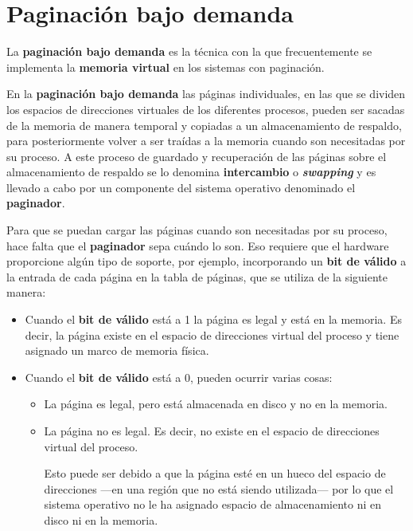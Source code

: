\section{Paginación bajo demanda}\label{_paginaciuxf3n_bajo_demanda}

La \textbf{paginación bajo demanda}{} es la técnica con la que
frecuentemente se implementa la \textbf{memoria virtual} en los sistemas
con paginación.

En la \textbf{paginación bajo demanda} las páginas individuales, en las
que se dividen los espacios de direcciones virtuales de los diferentes
procesos, pueden ser sacadas de la memoria de manera temporal y copiadas
a un almacenamiento de respaldo, para posteriormente volver a ser
traídas a la memoria cuando son necesitadas por su proceso. A este
proceso de guardado y recuperación de las páginas sobre el
almacenamiento de respaldo se lo denomina \textbf{{}intercambio} o
\textbf{\emph{{}swapping}} y es llevado a cabo por un componente del
sistema operativo denominado el \textbf{{}paginador}.

Para que se puedan cargar las páginas cuando son necesitadas por su
proceso, hace falta que el \textbf{paginador} sepa cuándo lo son. Eso
requiere que el hardware proporcione algún tipo de soporte, por ejemplo,
incorporando un \textbf{bit de válido}{} a la entrada de cada página en
la tabla de páginas, que se utiliza de la siguiente manera:

\begin{itemize}
\item
  Cuando el \textbf{bit de válido} está a 1 la página es legal y está en
  la memoria. Es decir, la página existe en el espacio de direcciones
  virtual del proceso y tiene asignado un marco de memoria física.
\item
  Cuando el \textbf{bit de válido} está a 0, pueden ocurrir varias
  cosas:

  \begin{itemize}
  \item
    La página es legal, pero está almacenada en disco y no en la
    memoria.
  \item
    La página no es legal. Es decir, no existe en el espacio de
    direcciones virtual del proceso.

    Esto puede ser debido a que la página esté en un hueco del espacio
    de direcciones ---en una región que no está siendo utilizada--- por
    lo que el sistema operativo no le ha asignado espacio de
    almacenamiento ni en disco ni en la memoria.
  \end{itemize}
\end{itemize}

